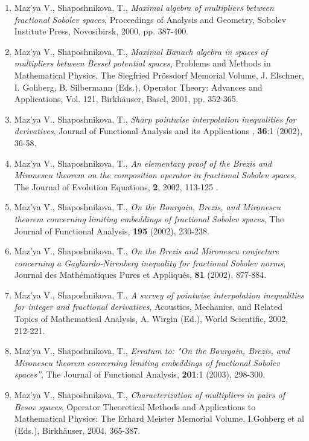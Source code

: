 \documentclass{article}
\begin{document}
\begin{enumerate}
\item Maz'ya V., Shaposhnikova, T., {\it Maximal algebra of
multipliers
between fractional Sobolev spaces}, Proceedings of Analysis and
Geometry, Sobolev Institute
Press, Novosibirsk, 2000, pp. 387-400.

\item Maz'ya V., Shaposhnikova, T., {\it Maximal Banach algebra in
spaces
of multipliers between Bessel potential spaces}, Problems and Methods
in
Mathematical Physics, The Siegfried Pr\"ossdorf Memorial Volume, J.
Elschner, I. Gohberg,
B. Silbermann (Eds.), Operator Theory: Advances and Applications, Vol.
121,
Birkh\"auser, Basel, 2001, pp. 352-365.

\item Maz'ya V., Shaposhnikova, T., {\it Sharp pointwise interpolation
inequalities for derivatives},  Journal of Functional
Analysis and its Applications , {\bf 36}:1 (2002), 36-58.

\item Maz'ya V., Shaposhnikova, T., {\it An elementary proof of the
Brezis and
Mironescu theorem on the composition operator in fractional Sobolev
spaces}, The Journal of
Evolution Equations, {\bf 2}, 2002, 113-125 .

\item Maz'ya V., Shaposhnikova, T., {\it On the Bourgain, Brezis, and
Mironescu theorem concerning limiting embeddings of fractional Sobolev
spaces}, The Journal of Functional Analysis, {\bf 195} (2002),
230-238.

\item Maz'ya V., Shaposhnikova, T., {\it On the Brezis and
Mironescu conjecture concerning a Gagliardo-Nirenberg inequality for
fractional Sobolev norms},  Journal des
Math\'ematiques Pures et Appliqu\'es, {\bf 81} (2002), 877-884.

\item Maz'ya V., Shaposhnikova, T., {\it A survey of pointwise 
interpolation inequalities for integer and fractional derivatives}, 
 Acoustics, Mechanics, and Related Topics of Mathematical Analysis, 
A. Wirgin (Ed.), World Scientific, 2002, 212-221.

\item Maz'ya V., Shaposhnikova, T., {\it Erratum to: "On the Bourgain,
Brezis, and Mironescu theorem concerning limiting embeddings of
fractional Sobolev spaces''}, The Journal of Functional Analysis, {\bf
201}:1 (2003), 298-300.


\item Maz'ya V., Shaposhnikova, T., {\it Characterization of
multipliers
in pairs of Besov spaces}, Operator Theoretical Methods and
Applications
to Mathematical Physics: The Erhard Meister Memorial Volume, I.Gohberg et al (Eds.), Birkh\"auser, 2004, 365-387.


\end{enumerate}
\end{document}
